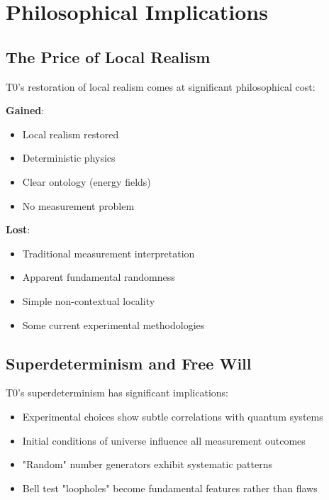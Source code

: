 \documentclass[12pt,a4paper]{article}
\begin{document}
	\section{Philosophical Implications}
	
	\subsection{The Price of Local Realism}
	
	T0's restoration of local realism comes at significant philosophical cost:
	
	\begin{tcolorbox}[colback=purple!5!white,colframe=purple!75!black,title=Philosophical Trade-offs]
		\textbf{Gained}:
		\begin{itemize}
			\item Local realism restored
			\item Deterministic physics
			\item Clear ontology (energy fields)
			\item No measurement problem
		\end{itemize}
		
		\textbf{Lost}:
		\begin{itemize}
			\item Traditional measurement interpretation
			\item Apparent fundamental randomness
			\item Simple non-contextual locality
			\item Some current experimental methodologies
		\end{itemize}
	\end{tcolorbox}
	
	\subsection{Superdeterminism and Free Will}
	
	T0's superdeterminism has significant implications:
	
	\begin{itemize}
		\item Experimental choices show subtle correlations with quantum systems
		\item Initial conditions of universe influence all measurement outcomes
		\item "Random" number generators exhibit systematic patterns
		\item Bell test "loopholes" become fundamental features rather than flaws
	\end{itemize}
	
\end{document}
